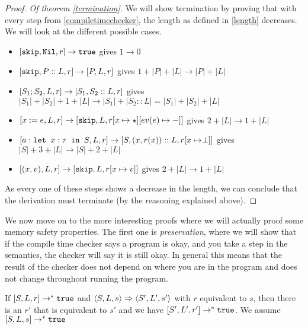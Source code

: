 \begin{proof}
\emph{Of theorem \ref{termination}.}
We will show termination by proving that with every step from \ref{compiletimechecker}, the length as defined in \ref{length} decreases. We will look at the different possible cases.

\begin{itemize}
    \item $[ \texttt{skip}, \texttt{Nil}, r ] \to \texttt{true}$ gives $1 \to 0$
    \item $[ \texttt{skip}, P::L,  r ] \to [ P, L, r ]$ gives $1 + |P| + |L| \to |P| + |L|$
    \item $[ S_1; S_2, L, r ] \to [ S_1, S_2::L, r ]$ gives $|S_1| + |S_2| + 1 + |L| \to |S_1| + |S_2::L| = |S_1| + |S_2| + |L|$
    \item $[ x:=e, L, r ] \to [ \texttt{skip}, L, r[x\mapsto \star][ev(e) \mapsto -] ]$ gives $2 + |L| \to 1 + |L|$
    \item $[ a : \texttt{let }x : \tau \texttt{ in } S, L, r ] \to [ S, (x,r(x))::L, r[x\mapsto \perp] ]$ gives $|S|+3+|L|\to |S|+2+|L|$
    \item $[ (x,v), L, r ] \to [ \texttt{skip}, L, r[x \mapsto v] ]$ gives $2 + |L| \to 1 + |L|$
\end{itemize}
As every one of these steps shows a decrease in the length, we can conclude that the derivation must terminate (by the reasoning explained above).
\end{proof}

We now move on to the more interesting proofs where we will actually proof some memory safety properties. 
The first one is \emph{preservation}, where we will show that if the compile time checker says a program is okay, and you take a step in the semantics, the checker will say it is still okay. In general this means that the result of the checker does not depend on where you are in the program and does not change throughout running the program. 

\begin{theorem}
If $[ S, L, r ] \to ^* \texttt{true}$ and $\langle S, L, s \rangle \Rightarrow \langle S', L', s' \rangle$ with $r$ equivalent to $s$, then there is an $r'$ that is equivalent to $s'$ and we have $[ S', L', r' ] \to ^* \texttt{true}$. We assume $[ S, L, s ] \to ^* \texttt{true}$
\end{theorem}


